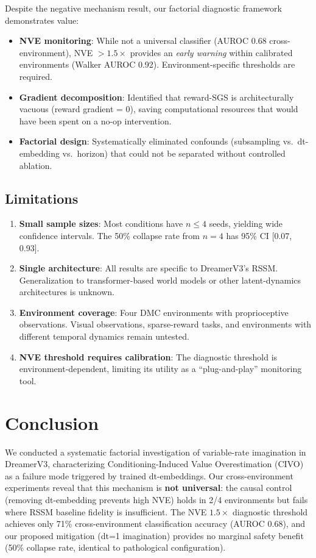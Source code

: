 \documentclass[10pt,twocolumn]{article}
\begin{document}
Despite the negative mechanism result, our factorial diagnostic framework demonstrates value:
\begin{itemize}
\item \textbf{NVE monitoring}: While not a universal classifier (AUROC 0.68 cross-environment), NVE $>1.5\times$ provides an \emph{early warning} within calibrated environments (Walker AUROC 0.92). Environment-specific thresholds are required.
\item \textbf{Gradient decomposition}: Identified that reward-SGS is architecturally vacuous (reward gradient = 0), saving computational resources that would have been spent on a no-op intervention.
\item \textbf{Factorial design}: Systematically eliminated confounds (subsampling vs.\ dt-embedding vs.\ horizon) that could not be separated without controlled ablation.
\end{itemize}

\subsection{Limitations}

\begin{enumerate}
\item \textbf{Small sample sizes}: Most conditions have $n \leq 4$ seeds, yielding wide confidence intervals. The 50\% collapse rate from $n=4$ has 95\% CI [0.07, 0.93].
\item \textbf{Single architecture}: All results are specific to DreamerV3's RSSM. Generalization to transformer-based world models or other latent-dynamics architectures is unknown.
\item \textbf{Environment coverage}: Four DMC environments with proprioceptive observations. Visual observations, sparse-reward tasks, and environments with different temporal dynamics remain untested.
\item \textbf{NVE threshold requires calibration}: The diagnostic threshold is environment-dependent, limiting its utility as a ``plug-and-play'' monitoring tool.
\end{enumerate}

\section{Conclusion}

We conducted a systematic factorial investigation of variable-rate imagination in DreamerV3, characterizing Conditioning-Induced Value Overestimation (CIVO) as a failure mode triggered by trained dt-embeddings. Our cross-environment experiments reveal that this mechanism is \textbf{not universal}: the causal control (removing dt-embedding prevents high NVE) holds in 2/4 environments but fails where RSSM baseline fidelity is insufficient. The NVE $1.5\times$ diagnostic threshold achieves only 71\% cross-environment classification accuracy (AUROC 0.68), and our proposed mitigation (dt=1 imagination) provides no marginal safety benefit (50\% collapse rate, identical to pathological configuration).
\end{document}
